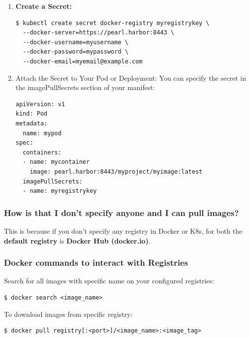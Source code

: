 \documentclass{article}
\newenvironment{codetemplate}[1][]{%
  \mybasecolorbox[#1]
  \itshape
}{%
  \endmybasecolorbox
}
\begin{document}
\begin{enumerate}
    \item \textbf{Create a Secret:}
\begin{codetemplate}{}
\begin{verbatim}
$ kubectl create secret docker-registry myregistrykey \
  --docker-server=https://pearl.harbor:8443 \
  --docker-username=myusername \
  --docker-password=mypassword \
  --docker-email=myemail@example.com
\end{verbatim}
\end{codetemplate}

    \item Attach the Secret to Your Pod or Deployment: You can specify the secret in the imagePullSecrets section of your manifest:
\begin{codetemplate}{}
\begin{verbatim}
apiVersion: v1
kind: Pod
metadata:
  name: mypod
spec:
  containers:
  - name: mycontainer
    image: pearl.harbor:8443/myproject/myimage:latest
  imagePullSecrets:
  - name: myregistrykey
\end{verbatim}
\end{codetemplate}
\end{enumerate}

\subsubsection{How is that I don't specify anyone and I can pull images?}
This is because if you don't specify any registry in Docker 
or K8s, for both the \textbf{default registry} is \textbf{Docker Hub (docker.io)}.

\subsubsection{Docker commands to interact with Registries}
Search for all images with specific name on your configured registries:
\begin{codetemplate}{}
\begin{verbatim}
$ docker search <image_name>
\end{verbatim}
\end{codetemplate}

To download images from specific registry:
\begin{codetemplate}{}
\begin{verbatim}
$ docker pull registry[:<port>]/<image_name>:<image_tag>
\end{verbatim}
\end{codetemplate}
\end{document}
